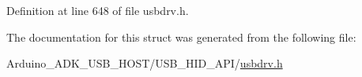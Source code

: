 Definition at line 648 of file usbdrv.\-h.



The documentation for this struct was generated from the following file\-:\begin{DoxyCompactItemize}
\item 
Arduino\-\_\-\-A\-D\-K\-\_\-\-U\-S\-B\-\_\-\-H\-O\-S\-T/\-U\-S\-B\-\_\-\-H\-I\-D\-\_\-\-A\-P\-I/\hyperlink{usbdrv_8h}{usbdrv.\-h}\end{DoxyCompactItemize}
